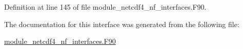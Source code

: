 Definition at line 145 of file module\+\_\+netcdf4\+\_\+nf\+\_\+interfaces.\+F90.



The documentation for this interface was generated from the following file\+:\begin{DoxyCompactItemize}
\item 
\hyperlink{module__netcdf4__nf__interfaces_8F90}{module\+\_\+netcdf4\+\_\+nf\+\_\+interfaces.\+F90}\end{DoxyCompactItemize}
